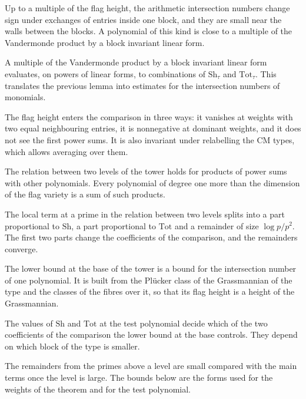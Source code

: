 Up to a multiple of the flag height, the arithmetic intersection numbers change sign under
exchanges of entries inside one block, and they are small near the walls between the blocks. A
polynomial of this kind is close to a multiple of the Vandermonde product by a block invariant
linear form.

A multiple of the Vandermonde product by a block invariant linear form evaluates, on powers of
linear forms, to combinations of $\mathrm{Sh}_\tau$ and $\mathrm{Tot}_\tau$. This translates the
previous lemma into estimates for the intersection numbers of monomials.

The flag height enters the comparison in three ways: it vanishes at weights with two equal
neighbouring entries, it is nonnegative at dominant weights, and it does not see the first power
sums. It is also invariant under relabelling the CM types, which allows averaging over them.

The relation between two levels of the tower holds for products of power sums with other
polynomials. Every polynomial of degree one more than the dimension of the flag variety is a sum
of such products.

The local term at a prime in the relation between two levels splits into a part proportional to
$\mathrm{Sh}$, a part proportional to $\mathrm{Tot}$ and a remainder of size $\log p/p^2$. The first two
parts change the coefficients of the comparison, and the remainders converge.

The lower bound at the base of the tower is a bound for the intersection number of one polynomial.
It is built from the Plücker class of the Grassmannian of the type and the classes of the fibres
over it, so that its flag height is a height of the Grassmannian.

The values of $\mathrm{Sh}$ and $\mathrm{Tot}$ at the test polynomial decide which of the two
coefficients of the comparison the lower bound at the base controls. They depend on which block of
the type is smaller.

The remainders from the primes above a level are small compared with the main terms once the level
is large. The bounds below are the forms used for the weights of the theorem and for the test
polynomial.

